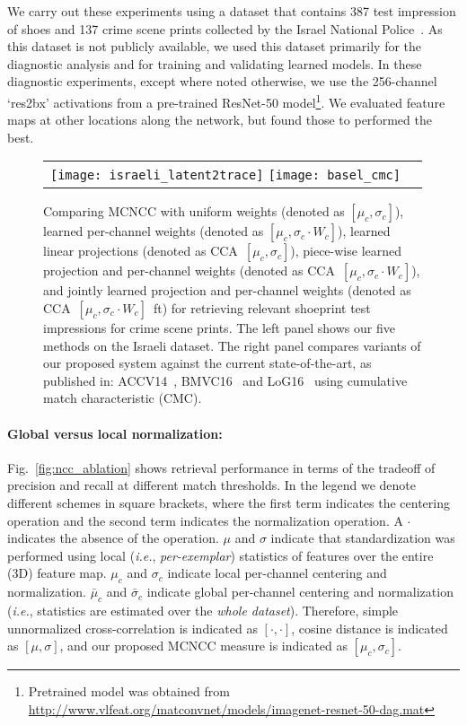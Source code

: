 \documentclass[twocolumn]{svjour3}           %
\newcommand{\ie}{\emph{i.e.}}
\begin{document}
We carry out these experiments using a dataset that contains 387 test
impression of shoes and 137 crime scene prints collected by the Israel National
Police~\cite{yekutieli2012expert}.  As this dataset is not publicly available,
we used this dataset primarily for the diagnostic analysis and for training and
validating learned models.  In these diagnostic experiments, except where noted 
otherwise, we use the
256-channel `res2bx' activations from a pre-trained ResNet-50
model\footnote{Pretrained model was obtained from
\url{http://www.vlfeat.org/matconvnet/models/imagenet-resnet-50-dag.mat}}.  We
evaluated feature maps at other locations along the network, but found those to
performed the best.
\begin{figure*}[t]
\begin{center}
\begin{tabular}{cc}
  \texttt{[image: israeli\_latent2trace]}
  \texttt{[image: basel\_cmc]}
  \end{tabular}\vspace{-2mm}
  \end{center}
  \caption{Comparing MCNCC with uniform weights (denoted as $[\mu_c,\sigma_c]$),
  learned per-channel weights (denoted as $[\mu_c,\sigma_c\cdot W_c]$),
  learned linear projections (denoted as CCA~$[\mu_c,\sigma_c]$), piece-wise
  learned projection and per-channel weights (denoted as
  CCA~$[\mu_c,\sigma_c\cdot W_c]$), and jointly learned projection and
  per-channel
  weights (denoted as CCA~$[\mu_c,\sigma_c\cdot W_c]$~ft) for
  retrieving relevant shoeprint test impressions for crime scene prints.
  The left panel shows our five methods on the Israeli dataset.
  The right panel compares variants of our proposed system against
  the current state-of-the-art, as published in:
  ACCV14~\cite{kortylewski2014unsupervised},
  BMVC16~\cite{kortylewski2016probabilistic} and LoG16~\cite{kortylewski2017model}
  using cumulative match characteristic (CMC).}
  \label{fig:latent2trace}
\end{figure*}


\paragraph{Global versus local normalization:}
Fig.~\ref{fig:ncc_ablation} shows retrieval performance in terms of the
tradeoff of precision and recall at different match thresholds.
In the legend we denote different schemes in
square brackets, where the first term indicates the centering operation and the
second term indicates the normalization operation.  A $\cdot$ indicates the
absence of the operation.  $\mu$ and $\sigma$ indicate that standardization 
was performed using local (\ie, \emph{per-exemplar}) statistics of features over
the entire (3D) feature map.  $\mu_c$ and $\sigma_c$ indicate local per-channel
centering and normalization.  $\bar{\mu}_c$ and $\bar{\sigma}_c$ indicate
global per-channel centering and normalization (\ie, statistics are estimated
over the \emph{whole dataset}).  Therefore, simple unnormalized
cross-correlation is indicated as $[\cdot,\cdot]$, cosine distance is indicated
as $[\mu,\sigma]$, and our proposed MCNCC measure is indicated as
$[\mu_c,\sigma_c]$.
\end{document}
